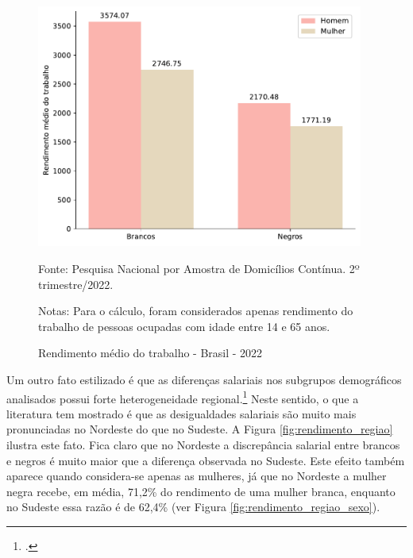 \documentclass[12pt]{article}
\begin{document}
\begin{figure}[H]
    \centering
    \caption{Rendimento médio do trabalho - Brasil - 2022}
        \includegraphics[height=8cm]{../figures/wage_2002_group.pdf}
    \label{fig:rendimento_trabalho}
    \begin{floatnotes}
        \item[Fonte:] Pesquisa Nacional por Amostra de Domicílios Contínua. 2º trimestre/2022.
        \item[Notas:] Para o cálculo, foram considerados apenas rendimento do trabalho de pessoas ocupadas com idade entre 14 e 65 anos.
    \end{floatnotes}
\end{figure}

\par Um outro fato estilizado é que as diferenças salariais nos subgrupos de\-mo\-grá\-fi\-cos analisados possui forte heterogeneidade regional.\footcite{campante2004desigualdade} Neste sentido, o que a literatura tem mostrado é que as desigualdades salariais são muito mais pronunciadas no Nordeste do que no Sudeste. A Figura \ref{fig:rendimento_regiao} ilustra este fato. Fica claro que no Nordeste a discrepância salarial entre brancos e negros é muito maior que a diferença observada no Sudeste. Este efeito também aparece quando considera-se apenas as mulheres, já que no Nordeste a mulher negra recebe, em média, 71,2\% do rendimento de uma mulher branca, enquanto no Sudeste essa razão é de 62,4\% (ver Figura \ref{fig:rendimento_regiao_sexo}).
\end{document}
